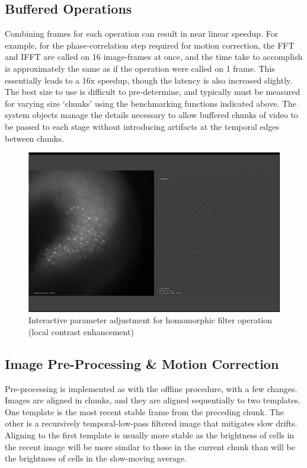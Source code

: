 \subsection{Buffered Operations}\label{sec:buffered-operations}

Combining frames for each operation can result in near linear speedup.
For example, for the phase-correlation step required for motion correction, the FFT and IFFT are called on 16 image-frames at once, and the time take to accomplish is approximately the same as if the operation were called on 1 frame.
This essentially leads to a 16x speedup, though the latency is also increased slightly.
The best size to use is difficult to pre-determine, and typically must be measured for varying size `chunks' using the benchmarking functions indicated above.
The system objects manage the details necessary to allow buffered chunks of video to be passed to each stage without introducing artifacts at the temporal edges between chunks.

\begin{figure}[htb]\centering
	\includegraphics[width=12cm]{figures/screenshot_20150608180058.png}
	\caption{Interactive parameter adjustment for homomorphic filter operation (local contrast enhancement)}
\end{figure}

\subsection{Image Pre-Processing \& Motion Correction}\label{sec:image-pre-processing-motion-correction}

Pre-processing is implemented as with the offline procedure, with a few changes.
Images are aligned in chunks, and they are aligned sequentially to two templates.
One template is the most recent stable frame from the preceding chunk.
The other is a recursively temporal-low-pass filtered image that mitigates slow drifts.
Aligning to the first template is usually more stable as the brightness of cells in the recent image will be more similar to those in the current chunk than will be the brightness of cells in the slow-moving average.

